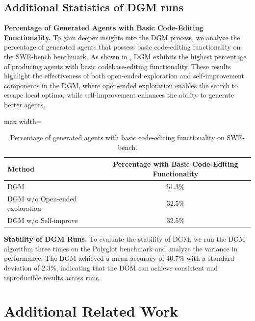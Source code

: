 \documentclass{article}
\begin{document}
\subsection{Additional Statistics of DGM runs}
\textbf{Percentage of Generated Agents with Basic Code-Editing Functionality.}
To gain deeper insights into the DGM process, we analyze the percentage of generated agents that possess basic code-editing functionality on the SWE-bench benchmark. As shown in , DGM exhibits the highest percentage of producing agents with basic codebase-editing functionality. These results highlight the effectiveness of both open-ended exploration and self-improvement components in the DGM, where open-ended exploration enables the search to escape local optima, while self-improvement enhances the ability to generate better agents.

\begin{table}[H]
\centering
\caption{Percentage of generated agents with basic code-editing functionality on SWE-bench.}
\begin{adjustbox}{max width=\textwidth}
\begin{tabular}{lc}
\toprule
\textbf{Method} & \textbf{Percentage with Basic Code-Editing Functionality} \\
\midrule
DGM & 51.3\% \\
DGM w/o Open-ended exploration & 32.5\% \\
DGM w/o Self-improve & 32.5\% \\
\bottomrule
\end{tabular}
\end{adjustbox}
\label{tab:code_editing}
\end{table}

\textbf{Stability of DGM Runs.}
To evaluate the stability of DGM, we run the DGM algorithm three times on the Polyglot benchmark and analyze the variance in performance. The DGM achieved a mean accuracy of 40.7\% with a standard deviation of 2.3\%, indicating that the DGM can achieve consistent and reproducible results across runs.


\section{Additional Related Work}
\label{app:related}
\end{document}
